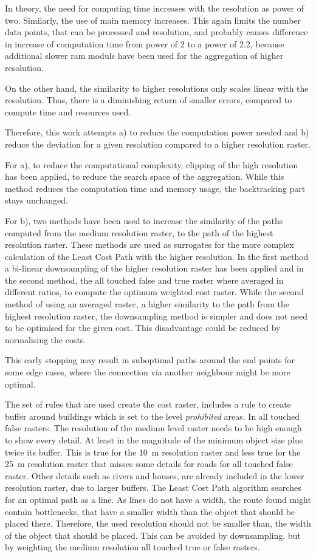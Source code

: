 In theory, the need for computing time increases with the resolution as power of two. 
Similarly, the use of main memory increases. 
This again limits the number data points, that can be processed and resolution, and probably causes difference in increase of computation time from power of 2 to a power of 2.2, because additional slower ram moduls have been used for the aggregation of higher resolution.

On the other hand, the similarity to higher resolutions only scales linear with the resolution. 
Thus, there is a diminishing return of smaller errors, compared to compute time and resources used.

Therefore, this work attempts a) to reduce the computation power needed and b) reduce the deviation for a given resolution compared to a higher resolution raster.

For a), to reduce the computational complexity, clipping of the high resolution has been applied, to reduce the search space of the aggregation.
While this method reduces the computation time and memory usage, the backtracking part stays unchanged.

For b), two methods have been used to increase the similarity of the paths computed from the medium resolution raster, to the path of the highest resolution raster.
These methods are used as surrogates for the more complex calculation of the Least Cost Path with the higher resolution.
In the first method a bi-linear downsampling of the higher resolution raster has been applied and in the second method, the all touched false and true raster where averaged in different ratios, to compute the optimum weighted cost raster.
While the second method of using an averaged raster, a higher similarity to the path from the highest resolution raster, the downsampling method is simpler and does not need to be optimised for the given cost.
This disadvantage could be reduced by normalising the costs.

This early stopping may result in suboptimal paths around the end points for some edge cases, where the connection via another neighbour might be more optimal.

The set of rules that are used create the cost raster, includes a rule to create buffer around buildings which is set to the level \textit{prohibited} areas.
In all touched false rasters.
The resolution of the medium level raster needs to be high enough to show every detail.
At least in the magnitude of the minimum object size plus twice its buffer.
This is true for the 10~m resolution raster and less true for the 25~m resolution raster that misses some details for roads for all touched false raster.
Other details such as rivers and houses, are already included in the lower resolution raster, due to larger buffers.
The Least Cost Path algorithm searches for an optimal path as a line.
As lines do not have a width, the route found might contain bottlenecks, that have a smaller width than the object that should be placed there.
Therefore, the used resolution should not be smaller than, the width of the object that should be placed.
This can be avoided by downsampling, but by weighting the medium resolution all touched true or false rasters.


